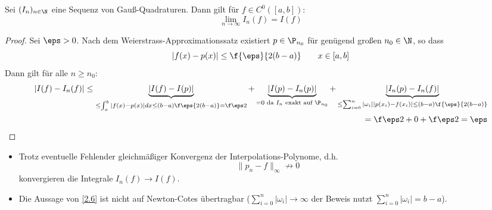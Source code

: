 \documentclass[11pt]{scrbook}
\begin{document}
\begin{st}[Konvergenz]
	\label{2.26}
	Sei $(I_n)_{n\in \N}$ eine Sequenz von Gauß-Quadraturen.
	Dann gilt für $f\in C^0([a,b])$:
	\[
		\lim_{n\to \infty} I_n(f) = I(f)
	\]
	\begin{proof}
		Sei $\eps > 0$.
		Nach dem Weierstrass-Approximationssatz existiert $p\in \P_{n_0}$ für genügend großen $n_0\in \N$, so dass
		\[
			|f(x) - p(x)| \le \f {\eps}{2(b-a)} \qquad x\in [a,b]
		\]
		Dann gilt für alle $n\ge n_0$:
		\begin{align*}
			|I(f) - I_n(f)|
			\le \underbrace{|I(f) - I(p)|}_{\le \int_a^b |f(x) - p(x)| dx \le (b-a)\f \eps{2(b-a)}= \f \eps 2} 
			+ \underbrace{|I(p) - I_n(p)|}_{=0 \text{ da $I_n$ exakt auf $\P_{n_0}$}} 
			+ \underbrace{|I_n(p)-I_n(f)|}_{\le \sum_{i=0}^n |\omega_i||p(x_i)-f(x_i)| \le (b-a) \f {\eps}{2(b-a)} } \\
			= \f \eps 2 + 0 + \f \eps 2 = \eps
		\end{align*}
	\end{proof}
	\begin{note}
		\begin{itemize}
			\item
				Trotz eventuelle Fehlender gleichmäßiger Konvergenz der Interpolations-Polynome, d.h.
				\[
					\|p_n - f\|_\infty \not \to 0
				\]
				konvergieren die Integrale $I_n(f) \to I(f)$.
			\item
				Die Aussage von \ref{2.6} ist nicht auf Newton-Cotes übertragbar ($\sum_{i=0}^n |\omega_i| \to \infty$ der Beweis nutzt $\sum_{i=0}^n |\omega_i| = b-a$).
		\end{itemize}
	\end{note}
\end{st}
\end{document}
